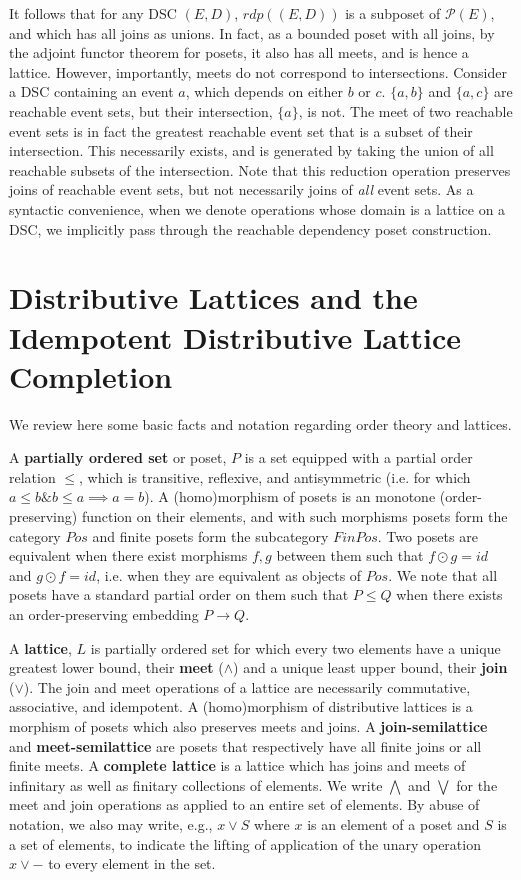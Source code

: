 \documentclass[hoptionsi,review,format=acmsmall]{acmart}
\theoremstyle{definition}
\newcommand{\Pc}{\mathcal{P}}
\newcommand{\band}{\mathbin{\&}}
\begin{document}
It follows that for any DSC \((E,D)\), \(rdp((E,D))\)  is a subposet of \(\Pc(E)\), and which has all joins as unions. In fact, as a bounded poset with all joins, by the adjoint functor theorem for posets, it also has all  meets, and is hence a lattice.
However, importantly, meets do not correspond to intersections. Consider a DSC containing an event \(a\), which depends on either \(b\) or \(c\). \(\{a,b\}\) and  \(\{a,c\}\) are reachable event sets, but their intersection, \(\{a\}\), is not. The meet of two reachable event sets is in fact the greatest reachable event set that is a subset of their intersection. This necessarily exists, and is generated by taking the union of all reachable subsets of the intersection. Note that this reduction operation preserves joins of reachable event sets, but not necessarily joins of \textit{all} event sets. As a syntactic convenience, when we denote operations whose domain is a lattice on a DSC, we implicitly pass through the reachable dependency poset construction.

\section{Distributive Lattices and the Idempotent Distributive Lattice Completion}

We review here some basic facts and notation regarding order theory and lattices.

A \textbf{partially ordered set} or poset, \(P\) is a set equipped with a partial order relation \(\le\), which is transitive,  reflexive, and antisymmetric (i.e. for which \( a \le b \band b \le a \implies a = b\)). A (homo)morphism of posets is an monotone (order-preserving) function on their elements, and with such morphisms posets form the category \(Pos\) and finite posets form the subcategory \(FinPos\). Two posets are equivalent when there exist morphisms \(f, g\) between them such that \(f \odot g = id\) and \(g \odot f = id\), i.e. when they are equivalent as objects of \(Pos\). We note that all posets have a standard partial order on them such that \(P \le Q\) when there exists an order-preserving embedding \(P \rightarrow Q\).

A \textbf{lattice}, \(L\) is partially ordered set for which every two elements have a unique greatest lower bound, their \textbf{meet} (\(\wedge\)) and a unique least upper bound, their \textbf{join} (\(\vee\)). The join and meet operations of a lattice are necessarily commutative, associative, and idempotent. A (homo)morphism of distributive lattices is a morphism of posets which also preserves meets and joins. A \textbf{join-semilattice} and \textbf{meet-semilattice} are posets that respectively have all finite joins or all finite meets. A \textbf{complete lattice} is a lattice which has joins and meets of infinitary as well as finitary collections of elements. We write \(\bigwedge\) and \(\bigvee\) for the meet and join operations as applied to an entire set of elements. By abuse of notation, we also may write, e.g., \(x \vee S\) where \(x\) is an element of a poset and \(S\) is a set of elements, to indicate the lifting of application of the unary operation \(x \vee -\) to every element in the set.
\end{document}
